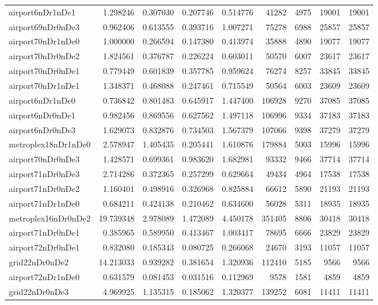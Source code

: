 \begin{longtable}{|l|r|r|r|r|r|r|r|r|}
airport6nDr1nDe1 & 1.298246 & 0.307030 & 0.207746 & 0.514776 & 41282 & 4975 & 19001 & 19001 \\
airport69nDr0nDe3 & 0.962406 & 0.613555 & 0.393716 & 1.007271 & 75278 & 6988 & 25857 & 25857 \\
airport70nDr1nDe0 & 1.000000 & 0.266594 & 0.147380 & 0.413974 & 35888 & 4890 & 19077 & 19077 \\
airport70nDr0nDe2 & 1.824561 & 0.376787 & 0.226224 & 0.603011 & 50570 & 6007 & 23617 & 23617 \\
airport70nDr0nDe1 & 0.779449 & 0.601839 & 0.357785 & 0.959624 & 76274 & 8257 & 33845 & 33845 \\
airport70nDr1nDe1 & 1.348371 & 0.468088 & 0.247461 & 0.715549 & 50564 & 6003 & 23609 & 23609 \\
airport6nDr1nDe0 & 0.736842 & 0.801483 & 0.645917 & 1.447400 & 106928 & 9270 & 37085 & 37085 \\
airport6nDr0nDe1 & 0.982456 & 0.869556 & 0.627562 & 1.497118 & 106996 & 9334 & 37183 & 37183 \\
airport6nDr0nDe3 & 1.629073 & 0.832876 & 0.734503 & 1.567379 & 107066 & 9398 & 37279 & 37279 \\
metroplex18nDr1nDe0 & 2.578947 & 1.405435 & 0.205441 & 1.610876 & 179884 & 5003 & 15996 & 15996 \\
airport70nDr0nDe3 & 1.428571 & 0.699361 & 0.983620 & 1.682981 & 93332 & 9466 & 37714 & 37714 \\
airport71nDr0nDe3 & 2.714286 & 0.372365 & 0.257299 & 0.629664 & 49434 & 4964 & 17538 & 17538 \\
airport71nDr0nDe2 & 1.160401 & 0.498916 & 0.326968 & 0.825884 & 66612 & 5890 & 21193 & 21193 \\
airport71nDr1nDe0 & 0.684211 & 0.424138 & 0.210462 & 0.634600 & 56028 & 5311 & 18935 & 18935 \\
metroplex16nDr0nDe2 & 19.739348 & 2.978089 & 1.472089 & 4.450178 & 351405 & 8806 & 30418 & 30418 \\
airport71nDr0nDe1 & 0.385965 & 0.589950 & 0.413467 & 1.003417 & 78695 & 6666 & 23829 & 23829 \\
airport72nDr0nDe1 & 0.832080 & 0.185343 & 0.080725 & 0.266068 & 24670 & 3193 & 11057 & 11057 \\
grid22nDr0nDe2 & 14.213033 & 0.939282 & 0.381654 & 1.320936 & 112410 & 5185 & 9566 & 9566 \\
airport72nDr1nDe0 & 0.631579 & 0.081453 & 0.031516 & 0.112969 & 9578 & 1581 & 4859 & 4859 \\
grid22nDr0nDe3 & 4.969925 & 1.135315 & 0.185062 & 1.320377 & 139252 & 6081 & 11411 & 11411 \\

\end{longtable}
